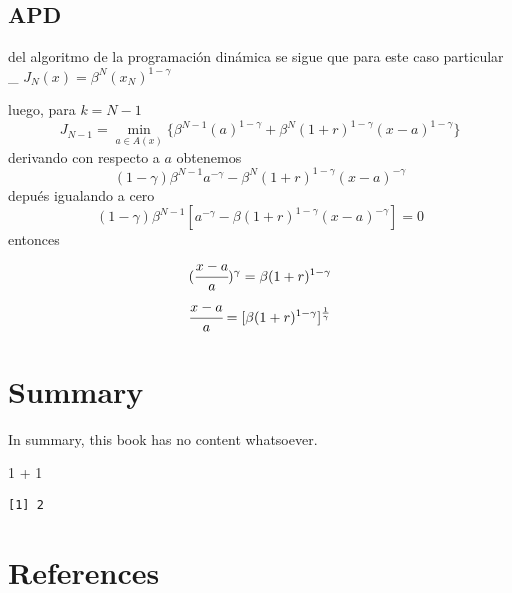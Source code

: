 \documentclass[
  letterpaper,
  DIV=11,
  numbers=noendperiod]{scrreprt}
\newenvironment{Shaded}{\begin{snugshade}}{\end{snugshade}}
\newcommand{\DecValTok}[1]{\textcolor[rgb]{0.68,0.00,0.00}{#1}}
\newcommand{\SpecialCharTok}[1]{\textcolor[rgb]{0.37,0.37,0.37}{#1}}
\newlength{\cslhangindent}
\newenvironment{CSLReferences}[2] %
 {\begin{list}{}{%
  \setlength{\itemindent}{0pt}
  \setlength{\leftmargin}{0pt}
  \setlength{\parsep}{0pt}
  \ifodd #1
   \setlength{\leftmargin}{\cslhangindent}
   \setlength{\itemindent}{-1\cslhangindent}
  \fi
  \setlength{\itemsep}{#2\baselineskip}}}
 {\end{list}}
\begin{document}
\section{APD}\label{apd}

del algoritmo de la programación dinámica se sigue que para este caso
particular \_ \(J_{N}(x)=\beta^{N}(x_N)^{1-\gamma}\)

luego, para \(k= N-1\)
\[J_{N-1}=\min_{a\in A(x)}\{\beta^{N-1}(a)^{1-\gamma} + \beta^{N}(1+r)^{1-\gamma}(x-a)^{1-\gamma}\}\]
derivando con respecto a \(a\) obtenemos
\[(1-\gamma)\beta^{N-1}a^{-\gamma}- \beta^{N}(1+r)^{1-\gamma}(x-a)^{-\gamma}\]
depués igualando a cero
\[(1-\gamma)\beta^{N-1}[a^{-\gamma}-\beta(1+r)^{1-\gamma}(x-a)^{-\gamma}]=0\]
entonces \[(\cfrac{x-a}{a})^\gamma=\beta(1+r)^{1-\gamma}\]
\[\cfrac{x-a}{a}=[\beta(1+r)^{1-\gamma}]^{\frac{1}{\gamma}}\]


\chapter{Summary}\label{summary}

In summary, this book has no content whatsoever.

\begin{Shaded}
\begin{Highlighting}[]
\DecValTok{1} \SpecialCharTok{+} \DecValTok{1}
\end{Highlighting}
\end{Shaded}

\begin{verbatim}
[1] 2
\end{verbatim}


\chapter*{References}\label{references}


\label{refs}
\begin{CSLReferences}{0}{1}
\end{CSLReferences}
\end{document}
